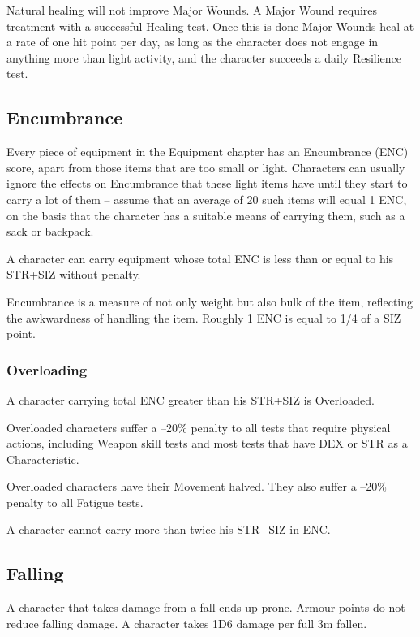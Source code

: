 Natural healing will not improve Major Wounds. A Major Wound requires treatment with a successful Healing test. Once this is done Major Wounds heal at a rate of one hit point per day, as long as the character does not engage in anything more than light activity, and the character succeeds a daily Resilience test. 


\subsection{Encumbrance}
\label{ssec:encumbrance}
Every piece of equipment in the Equipment chapter has an Encumbrance (ENC) score, apart from those items that are too small or light. Characters can usually ignore the effects on Encumbrance that these light items have until they start to carry a lot of them – assume that an average of 20 such items will equal 1 ENC, on the basis that the character has a suitable means of carrying them, such as a sack or backpack. 

A character can carry equipment whose total ENC is less than or equal to his STR+SIZ without penalty. 

Encumbrance is a measure of not only weight but also bulk of the item, reflecting the awkwardness of handling the item. Roughly 1 ENC is equal to 1/4 of a SIZ point.

\subsubsection{Overloading}
A character carrying total ENC greater than his STR+SIZ is Overloaded. 
\begin{rpg-list}
\item Overloaded characters suffer a –20\% penalty to all tests that require physical actions, including Weapon skill tests and most tests that have DEX or STR as a Characteristic. 

\item Overloaded characters have their Movement halved. They also suffer a –20\% penalty to all Fatigue tests. 
\end{rpg-list}

A character cannot carry more than twice his STR+SIZ in ENC. 

\subsection{Falling}
\label{ssec:falling}
A character that takes damage from a fall ends up prone. Armour points do not reduce falling damage. 
A character takes 1D6 damage per full 3m fallen.

